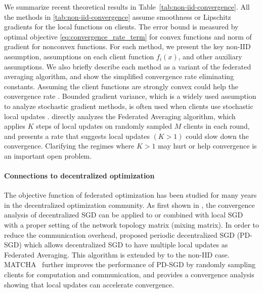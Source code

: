 We summarize recent theoretical results in Table~\ref{tab:non-iid-convergence}. All the methods in \cref{tab:non-iid-convergence} assume smoothness or Lipschitz gradients for the local functions on clients. 
The error bound is measured by optimal objective \eqref{eq:convergence_rate_term} for convex functions and norm of gradient for nonconvex functions. 
For each method, we present the key non-IID assumption, assumptions on each client function $f_i(x)$, and other auxiliary assumptions. We also briefly describe each method as a variant of the federated averaging algorithm, and show the simplified convergence rate eliminating constants.
 Assuming the client functions are strongly convex could help the convergence rate \citep{li2019convergence,karimireddy2019scaffold}.
 Bounded gradient variance, which is a widely used assumption to analyze stochastic gradient methods, is often used when clients use stochastic local updates \citep{Lian2017b,li2019convergence,li2019communication,wang2019matcha,karimireddy2019scaffold}. 
 \citet{li2019convergence} directly analyzes the Federated Averaging algorithm, which applies $K$ steps of local updates on randomly sampled $M$ clients in each round, and presents a rate that suggests local updates $(K > 1)$ could slow down the convergence. Clarifying the regimes where $K > 1$ may hurt or help convergence is an important open problem.

\paragraph{Connections to decentralized optimization} The objective function of federated optimization has been studied for many years in the decentralized optimization community. 
As first shown in \citet{wang2018cooperative}, the convergence analysis of decentralized SGD can be applied to or combined with local SGD with a proper setting of the network topology matrix (mixing matrix). In order to reduce the communication overhead, \citet{wang2018cooperative} proposed periodic decentralized SGD (PD-SGD) which allows decentralized SGD to have multiple local updates as Federated Averaging. This algorithm is  extended by \citet{li2019communication} to the non-IID case. MATCHA~\citep{wang2019matcha} further improves the performance of PD-SGD by randomly sampling clients for computation and communication, and provides a convergence analysis showing that local updates can accelerate convergence. 

